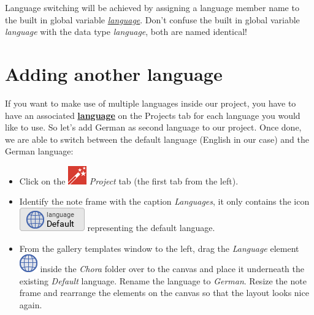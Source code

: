\documentclass[
  a4paper,
,tablecaptionabove
]{scrbook}
\begin{document}
Language switching will be achieved by assigning a language member name
to the built in global variable
\href{https://doc.embedded-wizard.de/language-variable}{\emph{language}}.
Don't confuse the built in global variable \emph{language} with the data
type \emph{language}, both are named identical!

\hypertarget{_adding_another_language}{%
\section{Adding another language}\label{_adding_another_language}}

If you want to make use of multiple languages inside our project, you
have to have an associated
\textbf{\href{https://doc.embedded-wizard.de/language-member}{language}}
on the Projects tab for each language you would like to use. So let's
add German as second language to our project. Once done, we are able to
switch between the default language (English in our case) and the German
language:

\begin{itemize}
\item
  Click on the
  \includegraphics{./../asciidoc/modules/ROOT/assets/images/icons/EmbeddedWizardIcon.png}
  \emph{Project} tab (the first tab from the left).
\item
  Identify the note frame with the caption \emph{Languages}, it only
  contains the icon
  \includegraphics{./../asciidoc/modules/ROOT/assets/images/icons/DefaultLanguageIcon.png}
  representing the default language.
\item
  From the gallery templates window to the left, drag the
  \emph{Language} element
  \includegraphics{./../asciidoc/modules/ROOT/assets/images/icons/LanguageIcon.png}
  inside the \emph{Chora} folder over to the canvas and place it
  underneath the existing \emph{Default} language. Rename the language
  to \emph{German}. Resize the note frame and rearrange the elements on
  the canvas so that the layout looks nice again.
\end{itemize}
\end{document}
